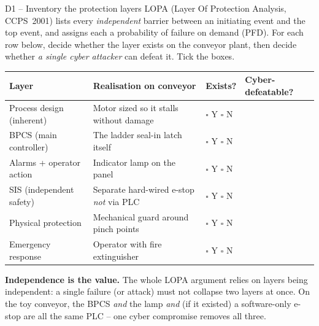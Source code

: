 \documentclass[11pt,a4paper]{article}
\begin{document}
\begin{stepbox}{D1 -- Inventory the protection layers}
LOPA (Layer Of Protection Analysis, CCPS~2001) lists every \emph{independent} barrier between an initiating event and the top event, and assigns each a probability of failure on demand (PFD). For each row below, decide whether the layer exists on the conveyor plant, then decide whether \emph{a single cyber attacker} can defeat it. Tick the boxes.

\medskip
\renewcommand{\arraystretch}{1.35}
\footnotesize
\begin{tabular}{|p{38mm}|p{42mm}|p{18mm}|p{42mm}|}
\hline
\textbf{Layer} & \textbf{Realisation on conveyor} & \textbf{Exists?} & \textbf{Cyber-defeatable?} \\
\hline
Process design (inherent) & Motor sized so it stalls without damage & $\square$ Y $\square$ N & \\
\hline
BPCS (main controller)    & The ladder seal-in latch itself & $\square$ Y $\square$ N & \\
\hline
Alarms + operator action  & Indicator lamp on the panel & $\square$ Y $\square$ N & \\
\hline
SIS (independent safety)  & Separate hard-wired e-stop \emph{not} via PLC & $\square$ Y $\square$ N & \\
\hline
Physical protection       & Mechanical guard around pinch points & $\square$ Y $\square$ N & \\
\hline
Emergency response        & Operator with fire extinguisher & $\square$ Y $\square$ N & \\
\hline
\end{tabular}

\medskip\noindent
\textbf{Independence is the value.} The whole LOPA argument relies on layers being independent: a single failure (or attack) must not collapse two layers at once. On the toy conveyor, the BPCS \emph{and} the lamp \emph{and} (if it existed) a software-only e-stop are all the same PLC -- one cyber compromise removes all three.
\end{stepbox}
\end{document}
